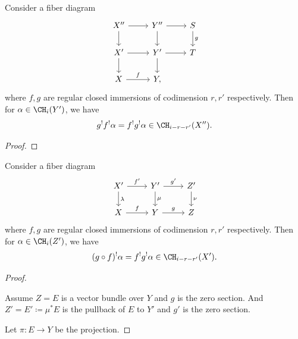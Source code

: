   \begin{theorem}[Commutativity ]
    Consider a fiber diagram
    \[ \begin{tikzcd}
      X'' \ar[r] \ar[d] & Y'' \ar[d] \ar[r] & S \ar[d,"g"] \\
      X' \ar[r] \ar[d] & Y' \ar[d] \ar[r] & T \\
      X \ar[r, "f"] & Y, &
    \end{tikzcd} \]
    where $f,g$ are regular closed immersions of codimension $r,r'$ respectively.
    Then for $\alpha \in \CH_i(Y')$, we have
    \[ g^! f^! \alpha = f^! g^! \alpha \in \CH_{i-r-r'}(X''). \]
  \end{theorem}
  \begin{proof}
    \Yang{}
  \end{proof}

  \begin{theorem}[Functoriality]
    Consider a fiber diagram
    \[ \begin{tikzcd}
      X' \ar[r, "f'"] \ar[d, "\lambda"]  & Y' \ar[r, "g'"] \ar[d, "\mu"] & Z' \ar[d, "\nu"] \\ 
      X \ar[r, "f"] & Y \ar[r, "g"] & Z
    \end{tikzcd} \]
    where $f,g$ are regular closed immersions of codimension $r,r'$ respectively.
    Then for $\alpha \in \CH_i(Z')$, we have
    \[ (g \circ f)^! \alpha = f^! g^! \alpha \in \CH_{i-r-r'}(X'). \]
  \end{theorem}
  \begin{proof}
    \hspace{1em}
    \begin{step}
      Assume $Z = E$ is a vector bundle over $Y$ and $g$ is the zero section.
      And $Z' = E' \coloneqq \mu^* E$ is the pullback of $E$ to $Y'$ and $g'$ is the zero section.
    \end{step}
    Let $\pi: E \to Y$ be the projection.
    \Yang{}
  \end{proof}

